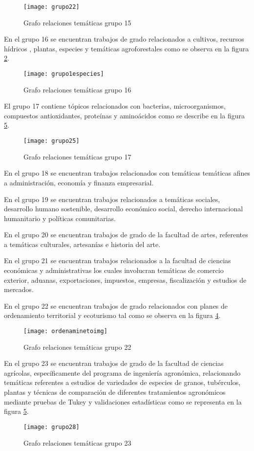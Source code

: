\begin{figure}[H]\centering
\texttt{[image: grupo22]}
\caption{Grafo  relaciones temáticas grupo 15}
\label{fig:grupo22}
\end{figure}


En el grupo 16 se encuentran trabajos de grado relacionados a cultivos, recursos hídricos  , plantas, especies y temáticas agroforestales como se observa en la figura \ref{fig:grupo1especies}.
\begin{figure}[H]\centering
\texttt{[image: grupo1especies]}
\caption{Grafo relaciones temáticas grupo 16 }
\label{fig:grupo1especies}
\end{figure}

El grupo 17 contiene tópicos relacionados con bacterias, microorganismos, compuestos antioxidantes, proteínas y aminoácidos como se describe en la figura \ref{fig:grupo25}.
\begin{figure}[H]\centering
\texttt{[image: grupo25]}
\caption{Grafo  relaciones temáticas grupo 17}
\label{fig:grupo25}
\end{figure}

En el grupo 18 se encuentran trabajos relacionados con temáticas temáticas afines a administración, economía y finanza empresarial.

En el grupo 19 se encuentran trabajos relacionados a temáticas sociales, desarrollo humano sostenible, desarrollo económico social, derecho internacional humanitario y políticas comunitarias.

En el grupo 20 se encuentran trabajos de grado de la facultad de artes, referentes a temáticas culturales, artesanías e  historia del arte.

En el grupo 21 se encuentran trabajos relacionados a la facultad de ciencias económicas y administrativas los cuales involucran temáticas de comercio exterior, aduanas, exportaciones, impuestos, empresas, fiscalización y estudios de mercados.


En el grupo 22 se encuentran trabajos de grado relacionados con planes de ordenamiento  territorial   y ecoturismo tal como se observa en la figura \ref{fig:ordenaminetoimg}.


\begin{figure}[H]\centering
\texttt{[image: ordenaminetoimg]}
\caption{Grafo relaciones temáticas grupo 22 }
\label{fig:ordenaminetoimg}
\end{figure}

En el grupo 23 se encuentran trabajos de grado de la facultad de ciencias agrícolas, específicamente del programa de ingeniería agronómica, relacionando temáticas referentes a estudios de variedades de especies de granos, tubérculos, plantas y técnicas de comparación de diferentes tratamientos agronómicos mediante pruebas de Tukey y validaciones estadísticas
como se representa en la figura \ref{fig:grupo25}.
\begin{figure}[H]\centering
\texttt{[image: grupo28]}
\caption{Grafo  relaciones temáticas grupo 23}
\label{fig:grupo25}
\end{figure}


